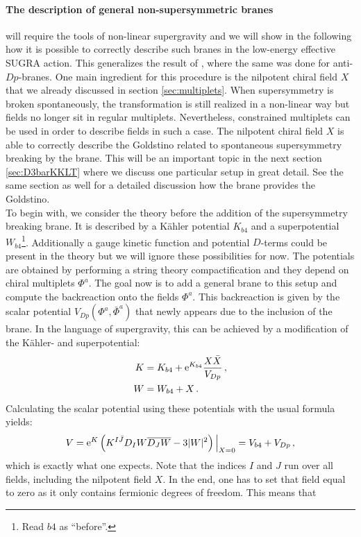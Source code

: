 \documentclass[a4paper,12pt]{report}
\newcommand{\be}{\begin{equation}}
\newcommand{\ee}{\end{equation}}
\newcommand{\bea}{\begin{equation}\begin{aligned}}
\newcommand{\eea}{\end{aligned}\end{equation}}
\def\rme{{\rm e}}
\begin{document}
\paragraph{The description of general non-supersymmetric branes} will require the tools of non-linear supergravity and we will show in the following how it is possible to correctly describe such branes in the low-energy effective SUGRA action. This generalizes the result of \cite{Kallosh:2018nrk}, where the same was done for anti-$Dp$-branes. One main ingredient for this procedure is the nilpotent chiral field $X$ that we already discussed in section \ref{sec:multiplets}. When supersymmetry is broken spontaneously, the transformation is still realized in a non-linear way but fields no longer sit in regular multiplets. Nevertheless, constrained multiplets can be used in order to describe fields in such a case. The nilpotent chiral field $X$ is able to correctly describe the Goldstino related to spontaneous supersymmetry breaking by the brane. This will be an important topic in the next section \ref{sec:D3barKKLT} where we discuss one particular setup in great detail. See the same section as well for a detailed discussion how the brane provides the Goldstino.\\
To begin with, we consider the theory before the addition of the supersymmetry breaking brane. It is described by a Kähler potential $K_{b4}$ and a superpotential $W_{b4}$\footnote{Read $b4$ as ``before''.}. Additionally a gauge kinetic function and potential $D$-terms could be present in the theory but we will ignore these possibilities for now. The potentials are obtained by performing a string theory compactification and they depend on chiral multiplets $\Phi^a$. The goal now is to add a general brane to this setup and compute the backreaction onto the fields $\Phi^a$. This backreaction is given by the scalar potential $V_{Dp}(\Phi^a,\bar{\Phi}^a)$ that newly appears due to the inclusion of the brane. In the language of supergravity, this can be achieved by a modification of the Kähler- and superpotential:
\bea
K &= K_{b4} + \rme^{K_{b4}} \frac{X\bar{X}}{V_{Dp}}\,,\\
W &= W_{b4} + X\,.
\label{eq:newsugra}
\eea
Calculating the scalar potential using these potentials with the usual formula yields:
\be 
V = \rme^K \left(K^{I\bar{J}} D_I W \overline{D_J W} - 3 |W|^2 \right)\Big|_{X=0}  = V_{b4} + V_{Dp}\,,
\ee
which is exactly what one expects. Note that the indices $I$ and $J$ run over all fields, including the nilpotent field $X$. In the end, one has to set that field equal to zero as it only contains fermionic degrees of freedom. This means that 
\end{document}
